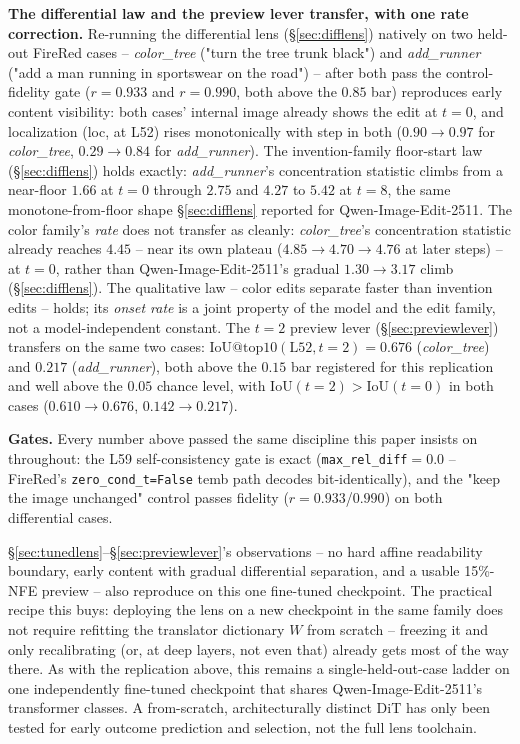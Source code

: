 \documentclass[10pt,twocolumn,letterpaper]{article}
\newcommand{\model}{Qwen-Image-Edit-2511}
\begin{document}
\textbf{The differential law and the preview lever transfer, with one
rate correction.} Re-running the differential lens
(\S\ref{sec:difflens}) natively on two held-out FireRed cases --
\emph{color\_tree} ("turn the tree trunk black") and \emph{add\_runner}
("add a man running in sportswear on the road") -- after both pass the
control-fidelity gate ($r=0.933$ and $r=0.990$, both above the $0.85$
bar) reproduces early content visibility: both cases' internal image already
shows the edit at $t{=}0$, and localization (loc, at L52) rises
monotonically with step in both ($0.90\to0.97$ for \emph{color\_tree},
$0.29\to0.84$ for \emph{add\_runner}). The invention-family
floor-start law (\S\ref{sec:difflens}) holds exactly:
\emph{add\_runner}'s concentration statistic climbs from a near-floor
$1.66$ at $t{=}0$ through $2.75$ and $4.27$ to $5.42$ at $t{=}8$, the
same monotone-from-floor shape \S\ref{sec:difflens} reported for
\model{}. The color family's \emph{rate} does not transfer as cleanly:
\emph{color\_tree}'s concentration statistic already reaches $4.45$ --
near its own plateau ($4.85\to4.70\to4.76$ at later steps) -- at
$t{=}0$, rather than \model{}'s gradual $1.30\to3.17$ climb
(\S\ref{sec:difflens}). The qualitative law -- color edits separate
faster than invention edits -- holds; its \emph{onset rate} is a joint
property of the model and the edit family, not a model-independent
constant. The $t{=}2$ preview lever (\S\ref{sec:previewlever})
transfers on the same two cases: $\mathrm{IoU@top10}(\text{L52},
t{=}2) = 0.676$ (\emph{color\_tree}) and $0.217$ (\emph{add\_runner}),
both above the $0.15$ bar registered for this replication and well
above the $0.05$ chance level, with $\mathrm{IoU}(t{=}2) >
\mathrm{IoU}(t{=}0)$ in both cases ($0.610\to0.676$,
$0.142\to0.217$).

\textbf{Gates.} Every number above passed the same discipline this
paper insists on throughout: the L59 self-consistency gate is exact
(\texttt{max\_rel\_diff}$=0.0$ -- FireRed's \texttt{zero\_cond\_t=False}
temb path decodes bit-identically), and the "keep the image unchanged"
control passes fidelity ($r=0.933$/$0.990$) on both differential cases.

\S\ref{sec:tunedlens}--\S\ref{sec:previewlever}'s observations -- no hard
affine readability boundary, early content with gradual differential
separation, and a usable 15\%-NFE preview -- also reproduce on this one
fine-tuned checkpoint. The practical
recipe this buys: deploying the lens on a new checkpoint in the same
family does not require refitting the translator dictionary $W$ from
scratch -- freezing it and only recalibrating (or, at deep layers, not
even that) already gets most of the way there. As with the replication
above, this remains a single-held-out-case ladder on one independently
fine-tuned checkpoint that shares \model{}'s transformer classes. A
from-scratch, architecturally distinct DiT has only been tested for early
outcome prediction and selection, not the full lens toolchain.
\end{document}
